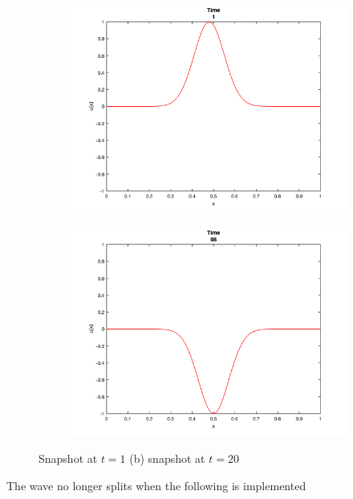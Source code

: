 \documentclass[12pt]{article}
\begin{document}
\begin{figure}[h!]
\centering

\begin{subfigure}{0.49\columnwidth}
\centering
\includegraphics[width=\textwidth]{problem_4_t_1.png}
\label{fig:time1}
\end{subfigure}\hfill
\begin{subfigure}{0.49\columnwidth}
\centering
\includegraphics[width=\textwidth]{problem_4_t_98.png}
\end{subfigure}
\caption{Snapshot at $t = 1$ (b) snapshot at $t = 20$}
\end{figure}

The wave no longer splits when the following is implemented
\end{document}
